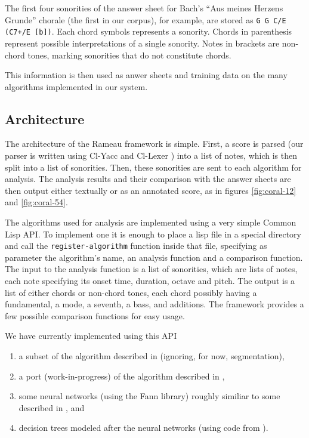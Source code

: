 \documentclass{article}
\begin{document}
The first four sonorities of the answer sheet for Bach's ``Aus meines
Herzens Grunde'' chorale (the first in our corpus), for example, are
stored as \texttt{G G C/E (C7+/E [b])}. Each chord symbols represents
a sonority. Chords in parenthesis represent possible interpretations
of a single sonority. Notes in brackets are non-chord tones, marking
sonorities that do not constitute chords.

This information is then used as anwer sheets and training data on the
many algorithms implemented in our system.

\subsection{Architecture}
\label{sec:architecture-and-api}

The architecture of the Rameau framework is simple. First, a score is
parsed (our parser is written using Cl-Yacc
\cite{chroboczek:_cl_yacc_manual} and Cl-Lexer
\cite{parker:_lexer_packag}) into a list of notes, which is then split
into a list of sonorities. Then, these sonorities are sent to each
algorithm for analysis. The analysis results and their comparison with
the answer sheets are then output either textually or as an annotated
score, as in figures \ref{fig:coral-12} and \ref{fig:coral-54}.

The algorithms used for analysis are implemented using a very simple
Common Lisp API. To implement one it is enough to place a lisp file in
a special directory and call the \texttt{register-algorithm} function
inside that file, specifying as parameter the algorithm's name, an
analysis function and a comparison function. The input to the analysis
function is a list of sonorities, which are lists of notes, each note
specifying its onset time, duration, octave and pitch. The output is a
list of either chords or non-chord tones, each chord possibly having a
fundamental, a mode, a seventh, a bass, and additions. The framework
provides a few possible comparison functions for easy usage.

We have currently implemented using this API 
\begin{enumerate}
\item a subset of the algorithm described in \cite{pardo02:algorithms}
  (ignoring, for now, segmentation), 
\item a port (work-in-progress) of the algorithm described in
  \cite{temperley99:modeling}, 
\item some neural networks (using the Fann \cite{nissen:fann}
  library) roughly similiar to some described in
  \cite{tsui02:_harmon_analy_using_neural_networ}, and
\item decision trees modeled after the neural networks (using code
  from \cite{Mitchell:1997:ML}).
\end{enumerate}
\end{document}
